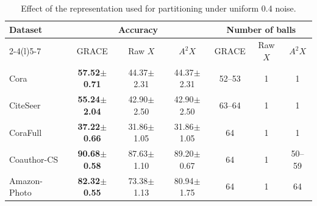 \begin{table}[!htb]
\centering
\caption{Effect of the representation used for partitioning under uniform 0.4 noise.}\label{tab:6}
\begingroup
\fontsize{9}{11}\selectfont
\setlength{\tabcolsep}{5pt}
\renewcommand{\arraystretch}{1.18}
\begin{tabular*}{\linewidth}{@{\extracolsep{\fill}}lcccccc@{}}
\toprule
\textbf{Dataset} & \multicolumn{3}{c}{\textbf{Accuracy}} & \multicolumn{3}{c}{\textbf{Number of balls}}\\
\cmidrule(lr){2-4}\cmidrule(l){5-7}
& GRACE & Raw \(X\) & \(A^2X\) & GRACE & Raw \(X\) & \(A^2X\)\\
\midrule
Cora & \textbf{57.52\ensuremath{\pm}0.71} & 44.37\ensuremath{\pm}2.31 & 44.37\ensuremath{\pm}2.31 & 52--53 & 1 & 1 \\
CiteSeer & \textbf{55.24\ensuremath{\pm}2.04} & 42.90\ensuremath{\pm}2.50 & 42.90\ensuremath{\pm}2.50 & 63--64 & 1 & 1 \\
CoraFull & \textbf{37.22\ensuremath{\pm}0.66} & 31.86\ensuremath{\pm}1.05 & 31.86\ensuremath{\pm}1.05 & 64 & 1 & 1 \\
Coauthor-CS & \textbf{90.68\ensuremath{\pm}0.58} & 87.63\ensuremath{\pm}1.10 & 89.20\ensuremath{\pm}0.67 & 64 & 1 & 50--59 \\
Amazon-Photo & \textbf{82.32\ensuremath{\pm}0.55} & 73.38\ensuremath{\pm}1.13 & 80.94\ensuremath{\pm}1.75 & 64 & 1 & 64 \\
\bottomrule
\end{tabular*}
\endgroup
\end{table}
